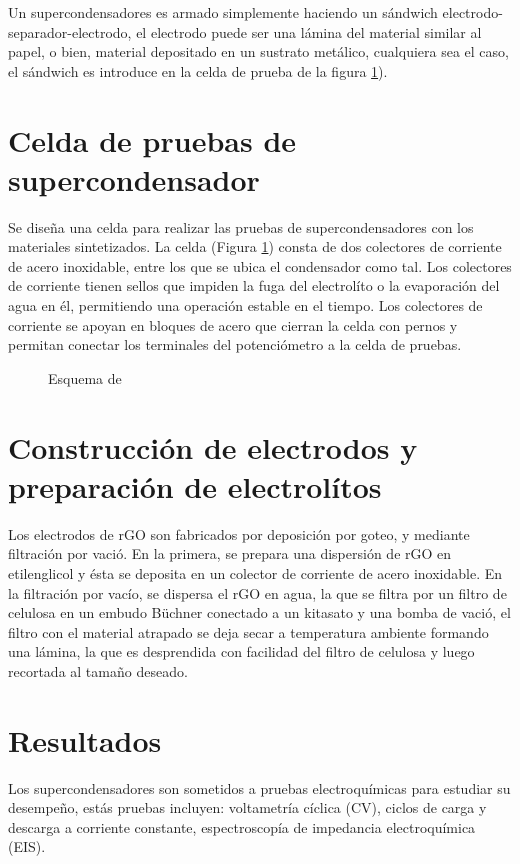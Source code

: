 Un supercondensadores es armado simplemente haciendo un sándwich electrodo-separador-electrodo, el electrodo puede ser una lámina del material similar al papel, o bien, material depositado en un sustrato metálico, cualquiera sea el caso, el sándwich es introduce en la celda de prueba de la figura \ref{fig:celda_de_pruebas_SC}). 

\section{Celda de pruebas de supercondensador}
Se diseña una celda para realizar las pruebas de supercondensadores con los materiales sintetizados. La celda (Figura \ref{fig:celda_de_pruebas_SC}) consta de dos colectores de corriente de acero inoxidable, entre los que se ubica el condensador como tal. Los colectores de corriente tienen sellos que impiden la fuga del electrolíto o la evaporación del agua en él, permitiendo una operación estable en el tiempo. Los colectores de corriente se apoyan en bloques de acero que cierran la celda con pernos y permitan conectar los terminales del potenciómetro a la celda de pruebas.

\begin{figure}[h!]
	\centering
	\caption{Esquema de }
	\label{fig:celda_de_pruebas_SC}
\end{figure}

\section{Construcción de electrodos y preparación de electrolítos}
Los electrodos de rGO son fabricados por deposición por goteo, y mediante filtración por vació. En la primera, se prepara una dispersión de rGO en etilenglicol y ésta se deposita en un colector de corriente de acero inoxidable. En la filtración por vacío, se dispersa el rGO en agua, la que se filtra por un filtro de celulosa en un embudo Büchner conectado a un kitasato y una bomba de vació, el filtro con el material atrapado se deja secar a temperatura ambiente formando una lámina, la que es desprendida con facilidad del filtro de celulosa y luego recortada al tamaño deseado.

\section{Resultados}
Los supercondensadores son sometidos a pruebas electroquímicas para estudiar su desempeño, estás pruebas incluyen: voltametría cíclica (CV), ciclos de carga y descarga a corriente constante, espectroscopía de impedancia electroquímica (EIS).

